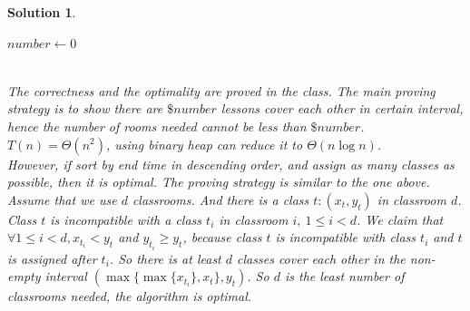 \documentclass{article}
\newtheorem*{solution}{Solution}
\begin{document}
\begin{enumerate}
\begin{solution}
\begin{minipage}[t]{0.8\textwidth}
\begin{algorithm}[H]
            $number \leftarrow 0$\\
        \end{algorithm}
    \end{minipage}\\
    The correctness and the optimality are proved in the class. The main proving strategy is to show there are $\$number$ lessons cover each other in certain interval, hence the number of rooms needed cannot be less than $\$number$. $T(n)=\Theta(n^2)$, using binary heap can reduce it to $\Theta(n\log n)$.
    \vspace{10pt}
    \\
    However, if sort by end time in descending order, and assign as many classes as possible, then it is optimal. The proving strategy is similar to the one above. Assume that we use $d$ classrooms. And there is a class $t : (x_t,y_t)$ in classroom $d$. Class $t$ is incompatible with a class $t_i$ in classroom $i,\ 1\leq i < d$. We claim that $\forall 1\leq i < d, x_{t_i} < y_t$ and $y_{t_i} \geq y_t$, because class $t$ is incompatible with class $t_i$ and $t$ is assigned after $t_i$. So there is at least $d$ classes cover each other in the non-empty interval $(\max\{\max\{x_{t_i}\}, x_t\}, y_t)$. So $d$ is the least number of classrooms needed, the algorithm is optimal.
\end{solution}
~\\



\end{enumerate}
\end{document}
